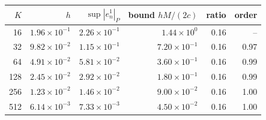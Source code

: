 \begin{tabular}{rrrrrr}
\toprule
$K$ & $h$ & $\sup|e^1_n|_P$ & bound $hM/(2c)$ & ratio & order\\
\midrule
16 & $1.96\times10^{-1}$ & $2.26\times10^{-1}$ & $1.44\times10^{0}$ & 0.16 & --\\
32 & $9.82\times10^{-2}$ & $1.15\times10^{-1}$ & $7.20\times10^{-1}$ & 0.16 & 0.97\\
64 & $4.91\times10^{-2}$ & $5.81\times10^{-2}$ & $3.60\times10^{-1}$ & 0.16 & 0.99\\
128 & $2.45\times10^{-2}$ & $2.92\times10^{-2}$ & $1.80\times10^{-1}$ & 0.16 & 0.99\\
256 & $1.23\times10^{-2}$ & $1.46\times10^{-2}$ & $9.00\times10^{-2}$ & 0.16 & 1.00\\
512 & $6.14\times10^{-3}$ & $7.33\times10^{-3}$ & $4.50\times10^{-2}$ & 0.16 & 1.00\\
\bottomrule
\end{tabular}